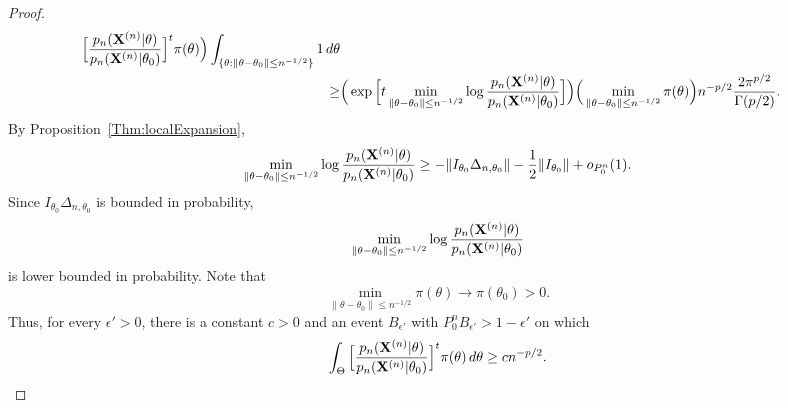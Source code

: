 \documentclass[3p]{elsarticle}
\theoremstyle{plain}
\theoremstyle{definition}
\theoremstyle{remark}
\begin{document}
\begin{proof}
$$\begin{aligned}
\Big[\frac{p_n(\mathbf{X}^{(n)}|\theta)}{p_n(\mathbf{X}^{(n)}|\theta_0)}\Big]^{t} \pi(\theta)
        \Big)
        \int_{\{\theta:\|\theta-\theta_0\|\leq n^{-1/2}\}}1\, d\theta\\
        \geq&
        \Big(
        \exp
\Big[
        t\min_{\|\theta-\theta_0\|\leq n^{-1/2}} 
        \log\frac{p_n(\mathbf{X}^{(n)}|\theta)}{p_n(\mathbf{X}^{(n)}|\theta_0)}
        \Big]
        \Big)
        \Big(\min_{\|\theta-\theta_0\|\leq n^{-1/2}} 
        \pi(\theta)
        \Big)
        n^{-p/2}\frac{2\pi^{p/2}}{\Gamma(p/2)}.
    \end{aligned}
    $$
    By Proposition~\ref{Thm:localExpansion},
    $$
   \begin{aligned} 
        \min_{\|\theta-\theta_0\|\leq n^{-1/2}} 
        \log\frac{p_n(\mathbf{X}^{(n)}|\theta)}{p_n(\mathbf{X}^{(n)}|\theta_0)}
        \geq
        -\|I_{\theta_0}\Delta_{n,\theta_0}\|-\frac{1}{2}\|I_{\theta_0}\|+
        o_{P^n_0}(1).
   \end{aligned}
    $$
    Since 
    $I_{\theta_0}\Delta_{n,\theta_0}$
    is bounded in probability, 
    $$\min_{\|\theta-\theta_0\|\leq n^{-1/2}} 
        \log\frac{p_n(\mathbf{X}^{(n)}|\theta)}{p_n(\mathbf{X}^{(n)}|\theta_0)}
    $$ is lower bounded in probability.
    Note that 
    $$\min_{\|\theta-\theta_0\|\leq n^{-1/2}} \pi(\theta)\to \pi(\theta_0)>0.$$
    Thus, for every $\epsilon'>0$, there is a constant $c>0$ and an event $B_{\epsilon'}$ with $P_0^n B_{\epsilon'}>1-\epsilon'$ on which
    $$
         \int_{\Theta}\Big[\frac{p_n(\mathbf{X}^{(n)}|\theta)}{p_n(\mathbf{X}^{(n)}|\theta_0)}\Big]^{t} \pi(\theta)\, d\theta\geq c n^{-p/2}.
    $$







\end{proof}
\end{document}
